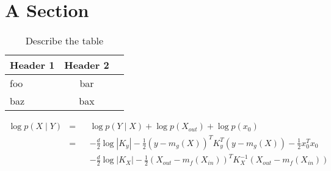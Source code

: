 \section{A Section}


\begin{table}[h]
  \caption{Describe the table}
  \centering
    \begin{tabular}{l c c}
      \toprule
      Header 1 & Header 2 \\
      \midrule
      foo & bar \\
      baz & bax \\
      \bottomrule
    \end{tabular}
  \label{tab:table_name}
\end{table}

\begin{equation}
  \begin{alignedat}{2}
    \log p(X\mid Y) &= && \log p(Y\mid X) + \log p(X_{out}) + \log p(x_0) \\
                    &= && -\frac{d}{2}\log|K_y|-\frac{1}{2}(y-m_g(X))^TK_y^T(y-m_g(X))-\frac{1}{2}x_0^Tx_0 \\
                    &  && -\frac{d}{2}\log|K_X|-\frac{1}{2}(X_{out}-m_f(X_{in}))^TK_X^{-1}(X_{out}-m_f(X_{in})) \\
  \end{alignedat}
\end{equation}
